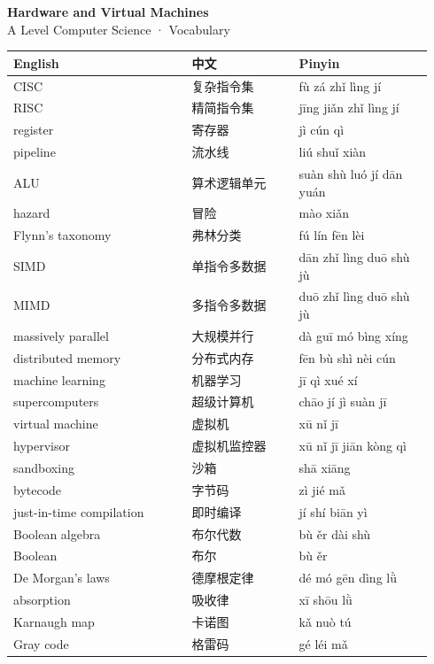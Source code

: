 \documentclass[11pt]{article}
\begin{document}
\begin{center}
  {\LARGE\bfseries Hardware and Virtual Machines}\\[0.35em]
  {\large A Level Computer Science · Vocabulary}
\end{center}
\vspace{0.6em}

\begin{longtable}{@{}p{0.40\linewidth}p{0.24\linewidth}p{0.30\linewidth}@{}}
\toprule
\textbf{English} & \textbf{中文} & \textbf{Pinyin} \\
\midrule
\endhead
\bottomrule
\endlastfoot
CISC & 复杂指令集 & fù zá zhǐ lìng jí \\
RISC & 精简指令集 & jīng jiǎn zhǐ lìng jí \\
register & 寄存器 & jì cún qì \\
pipeline & 流水线 & liú shuǐ xiàn \\
ALU & 算术逻辑单元 & suàn shù luó jí dān yuán \\
hazard & 冒险 & mào xiǎn \\
Flynn's taxonomy & 弗林分类 & fú lín fēn lèi \\
SIMD & 单指令多数据 & dān zhǐ lìng duō shù jù \\
MIMD & 多指令多数据 & duō zhǐ lìng duō shù jù \\
massively parallel & 大规模并行 & dà guī mó bìng xíng \\
distributed memory & 分布式内存 & fēn bù shì nèi cún \\
machine learning & 机器学习 & jī qì xué xí \\
supercomputers & 超级计算机 & chāo jí jì suàn jī \\
virtual machine & 虚拟机 & xū nǐ jī \\
hypervisor & 虚拟机监控器 & xū nǐ jī jiān kòng qì \\
sandboxing & 沙箱 & shā xiāng \\
bytecode & 字节码 & zì jié mǎ \\
just-in-time compilation & 即时编译 & jí shí biān yì \\
Boolean algebra & 布尔代数 & bù ěr dài shù \\
Boolean & 布尔 & bù ěr \\
De Morgan's laws & 德摩根定律 & dé mó gēn dìng lǜ \\
absorption & 吸收律 & xī shōu lǜ \\
Karnaugh map & 卡诺图 & kǎ nuò tú \\
Gray code & 格雷码 & gé léi mǎ \\

\end{longtable}
\end{document}
